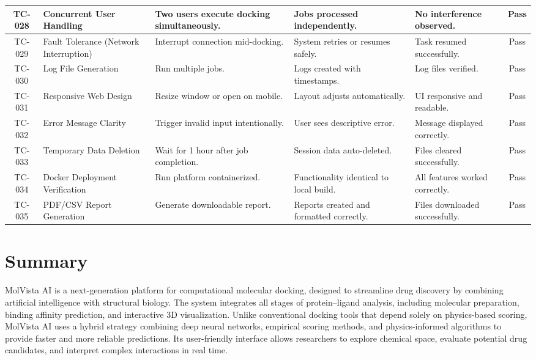 \documentclass[12pt,a4]{report}
\begin{document}
\begin{center}
\begin{tabularx}{\textwidth}{|c|>{\RaggedRight\arraybackslash}X|>{\RaggedRight\arraybackslash}X|>{\RaggedRight\arraybackslash}X|>{\RaggedRight\arraybackslash}X|c|}
TC-028 & Concurrent User Handling &
Two users execute docking simultaneously. &
Jobs processed independently. &
No interference observed. &
Pass \\ \hline

TC-029 & Fault Tolerance (Network Interruption) &
Interrupt connection mid-docking. &
System retries or resumes safely. &
Task resumed successfully. &
Pass \\ \hline

TC-030 & Log File Generation &
Run multiple jobs. &
Logs created with timestamps. &
Log files verified. &
Pass \\ \hline

TC-031 & Responsive Web Design &
Resize window or open on mobile. &
Layout adjusts automatically. &
UI responsive and readable. &
Pass \\ \hline

TC-032 & Error Message Clarity &
Trigger invalid input intentionally. &
User sees descriptive error. &
Message displayed correctly. &
Pass \\ \hline

TC-033 & Temporary Data Deletion &
Wait for 1 hour after job completion. &
Session data auto-deleted. &
Files cleared successfully. &
Pass \\ \hline

TC-034 & Docker Deployment Verification &
Run platform containerized. &
Functionality identical to local build. &
All features worked correctly. &
Pass \\ \hline

TC-035 & PDF/CSV Report Generation &
Generate downloadable report. &
Reports created and formatted correctly. &
Files downloaded successfully. &
Pass \\ \hline


\end{tabularx}
\end{center}
\normalsize




\section{Summary}
\hspace{0.3in}MolVista AI is a next-generation platform for computational molecular docking, designed to streamline drug discovery by combining artificial intelligence with structural biology. The system integrates all stages of protein–ligand analysis, including molecular preparation, binding affinity prediction, and interactive 3D visualization. Unlike conventional docking tools that depend solely on physics-based scoring, MolVista AI uses a hybrid strategy combining deep neural networks, empirical scoring methods, and physics-informed algorithms to provide faster and more reliable predictions. Its user-friendly interface allows researchers to explore chemical space, evaluate potential drug candidates, and interpret complex interactions in real time.\\
\end{document}
